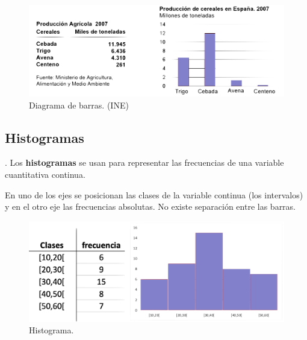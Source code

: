 \begin{example}

		\begin{figure}[H]
			\centering
			\includegraphics[width=1\textwidth]{imagenes/imagenes01/T01IM02.png}
			\caption*{\footnotesize{Diagrama de barras. (INE)}}
		\end{figure}
\end{example}

\subsection{Histogramas}
\begin{definition}
	. Los \textbf{histogramas} se usan para representar las frecuencias de una variable cuantitativa continua.

	\vspace{2mm} En uno de los ejes se posicionan las clases de la variable continua (los intervalos) y en el otro eje las frecuencias absolutas. No existe separación entre las barras.	
\end{definition}


\begin{example}

	\begin{figure}[H]
			\centering
			\includegraphics[width=.8\textwidth]{imagenes/imagenes01/T01IM03.png}
			\caption*{\footnotesize{Histograma.}}
		\end{figure}
\end{example}

